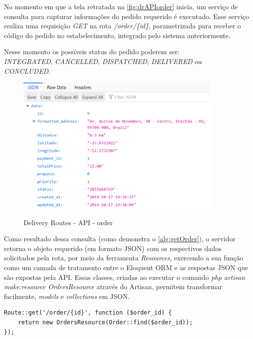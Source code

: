No momento em que a tela retratada na \autoref{fig:drAPIorder} inicia, um serviço de consulta para capturar informações do pedido requerido é executado. Esse serviço realiza uma requisição \textit{GET} na rota \textit{/order/\{id\}}, parametrizada para receber o código do pedido no estabelecimento, integrado pelo sistema anteriormente.

Nesse momento os possíveis status do pedido poderem ser: 
\\ \textit{INTEGRATED}, \textit{CANCELLED}, \textit{DISPATCHED}, \textit{DELIVERED} ou \textit{CONCLUDED}.

\begin{figure}[H]
    \centering
    \caption{Delivery Routes - API - order}
    \includegraphics[width=0.9\textwidth]{./dados/figuras/fig22}
    \label{fig:drAPIorder}
\end{figure}

Como resultado dessa consulta (como demonstra o \autoref{alg:getOrder}), o servidor retorna o objeto requerido (em formato JSON) com os respectivos dados solicitados pela rota, por meio da ferramenta \textit{Resources}, exercendo a sua função como um camada de tratamento entre o Eloquent ORM e as respostas JSON que são expostas pela API. Essas classes, criadas ao executar o comando \textit{php artisan make:resource OrdersResource} através do Artisan, permitem transformar facilmente, \textit{models} e \textit{collections} em JSON.

\begin{lstlisting}[caption={Delivery Routes - Route order}, style=htmlcssjs, label=alg:getOrder]
Route::get('/order/{id}', function ($order_id) {
    return new OrdersResource(Order::find($order_id));
});
\end{lstlisting}